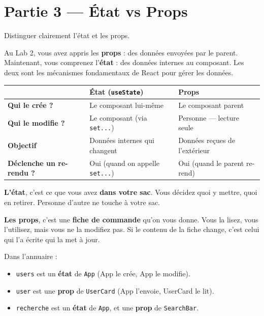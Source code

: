 \documentclass[11pt,a4paper]{article}
\begin{document}
\section{Partie 3 --- État vs Props}
\label{sec:etat-vs-props}

\begin{objectifbox}
Distinguer clairement l'état et les props.
\end{objectifbox}

Au Lab 2, vous avez appris les \textbf{props} : des données envoyées par le parent. Maintenant, vous comprenez l'\textbf{état} : des données internes au composant. Les deux sont les mécanismes fondamentaux de React pour gérer les données.

\begin{retenirbox}
\begin{center}
\begin{tabular}{lp{4.3cm}p{4.3cm}}
\toprule
& \textbf{État (\texttt{useState})} & \textbf{Props} \\
\midrule
\textbf{Qui le crée ?} & Le composant lui-même & Le composant parent \\
\textbf{Qui le modifie ?} & Le composant (via \texttt{set...}) & Personne --- lecture seule \\
\textbf{Objectif} & Données internes qui changent & Données reçues de l'extérieur \\
\textbf{Déclenche un re-rendu ?} & Oui (quand on appelle \texttt{set...}) & Oui (quand le parent re-rend) \\
\bottomrule
\end{tabular}
\end{center}
\end{retenirbox}

\begin{infobox}
\textbf{L'état}, c'est ce que vous avez \textbf{dans votre sac}. Vous décidez quoi y mettre, quoi en retirer. Personne d'autre ne touche à votre sac.

\textbf{Les props}, c'est une \textbf{fiche de commande} qu'on vous donne. Vous la lisez, vous l'utilisez, mais vous ne la modifiez pas. Si le contenu de la fiche change, c'est celui qui l'a écrite qui la met à jour.
\end{infobox}

Dans l'annuaire :
\begin{itemize}[nosep]
    \item \texttt{users} est un \textbf{état} de \texttt{App} (App le crée, App le modifie).
    \item \texttt{user} est une \textbf{prop} de \texttt{UserCard} (App l'envoie, UserCard le lit).
    \item \texttt{recherche} est un \textbf{état} de \texttt{App}, et une \textbf{prop} de \texttt{SearchBar}.
\end{itemize}
\end{document}
